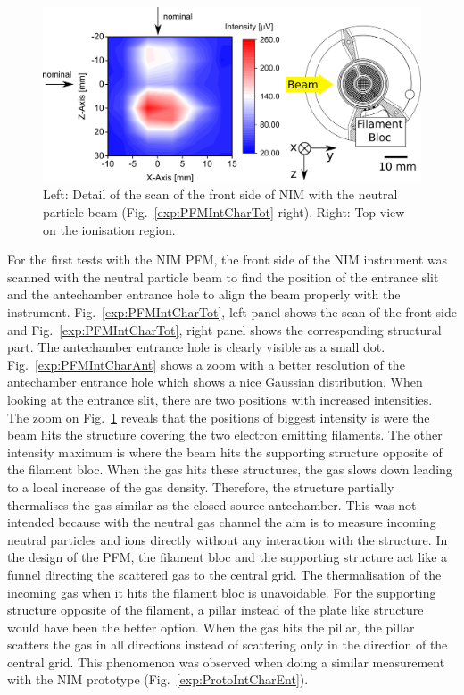 	\begin{figure}[h!]
		\centering
		\includegraphics[width=\textwidth]{Experiments/2D_scan_Entr.png}
		\caption{Left: Detail of the scan of the front side of NIM with the neutral particle beam (Fig.~\ref{exp:PFMIntCharTot} right). Right: Top view on the ionisation region.}
		\label{exp:PFMIntCharEnt}
	\end{figure}
	For the first tests with the NIM PFM, the front side of the NIM instrument was scanned with the neutral particle beam to find the position of the entrance slit and the antechamber entrance hole to align the beam properly with the instrument. Fig.~\ref{exp:PFMIntCharTot}, left panel shows the scan of the front side and Fig.~\ref{exp:PFMIntCharTot}, right panel shows the corresponding structural part. The antechamber entrance hole is clearly visible as a small dot. Fig.~\ref{exp:PFMIntCharAnt} shows a zoom with a better resolution of the antechamber entrance hole which shows a nice Gaussian distribution. When looking at the entrance slit, there are two positions with increased intensities. The zoom on Fig.~\ref{exp:PFMIntCharEnt} reveals that the positions of biggest intensity is were the beam hits the structure covering the two electron emitting filaments. The other intensity maximum is where the beam hits the supporting structure opposite of the filament bloc. When the gas hits these structures, the gas slows down leading to a local increase of the gas density. Therefore, the structure partially thermalises the gas similar as the closed source antechamber. This was not intended because with the neutral gas channel the aim is to measure incoming neutral particles and ions directly without any interaction with the structure. In the design of the PFM, the filament bloc and the supporting structure act like a funnel directing the scattered gas to the central grid. The thermalisation of the incoming gas when it hits the filament bloc is unavoidable. For the supporting structure opposite of the filament, a pillar instead of the plate like structure would have been the better option. When the gas hits the pillar, the pillar scatters the gas in all directions instead of scattering only in the direction of the central grid. This phenomenon was observed when doing a similar measurement with the NIM prototype (Fig.~\ref{exp:ProtoIntCharEnt}).\\
